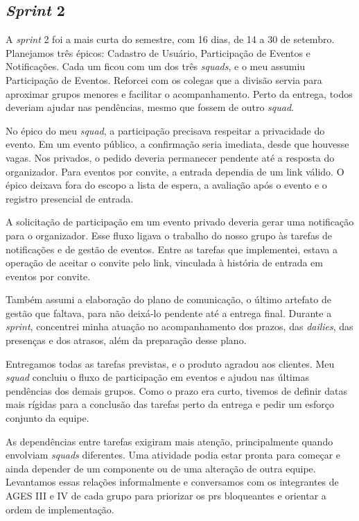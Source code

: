 \subsection{\textit{Sprint} 2}

A \textit{sprint} 2 foi a mais curta do semestre, com 16 dias, de 14 a 30 de
setembro. Planejamos três épicos: Cadastro de Usuário, Participação de Eventos
e Notificações. Cada um ficou com um dos três \textit{squads}, e o meu
assumiu Participação de Eventos. Reforcei com os colegas que a divisão servia
para aproximar grupos menores e facilitar o acompanhamento. Perto da entrega,
todos deveriam ajudar nas pendências, mesmo que fossem de outro
\textit{squad}.

No épico do meu \textit{squad}, a participação precisava respeitar a
privacidade do evento. Em um evento público, a confirmação seria imediata,
desde que houvesse vagas. Nos privados, o pedido deveria permanecer pendente
até a resposta do organizador. Para eventos por convite, a entrada dependia
de um link válido. O épico deixava fora do escopo a lista de espera, a
avaliação após o evento e o registro presencial de entrada.

A solicitação de participação em um evento privado deveria gerar uma
notificação para o organizador. Esse fluxo ligava o trabalho do nosso grupo
às tarefas de notificações e de gestão de eventos. Entre as tarefas que
implementei, estava a operação de aceitar o convite pelo link, vinculada à
história de entrada em eventos por convite.

Também assumi a elaboração do plano de comunicação, o último artefato de
gestão que faltava, para não deixá-lo pendente até a entrega final. Durante
a \textit{sprint}, concentrei minha
atuação no acompanhamento dos prazos, das \textit{dailies}, das presenças e
dos atrasos, além da preparação desse plano.

Entregamos todas as tarefas previstas, e o produto agradou aos clientes.
Meu \textit{squad} concluiu o fluxo de participação em eventos e ajudou nas
últimas pendências dos demais grupos. Como o prazo era curto, tivemos de
definir datas mais rígidas para a conclusão das tarefas perto da entrega e
pedir um esforço conjunto da equipe.

As dependências entre tarefas exigiram mais atenção, principalmente quando
envolviam \textit{squads} diferentes. Uma atividade podia estar pronta para
começar e ainda depender de um componente ou de uma alteração de outra
equipe. Levantamos essas relações informalmente e conversamos com os
integrantes de AGES III e IV de cada grupo para priorizar os \acp{pr}
bloqueantes e orientar a ordem de implementação.

